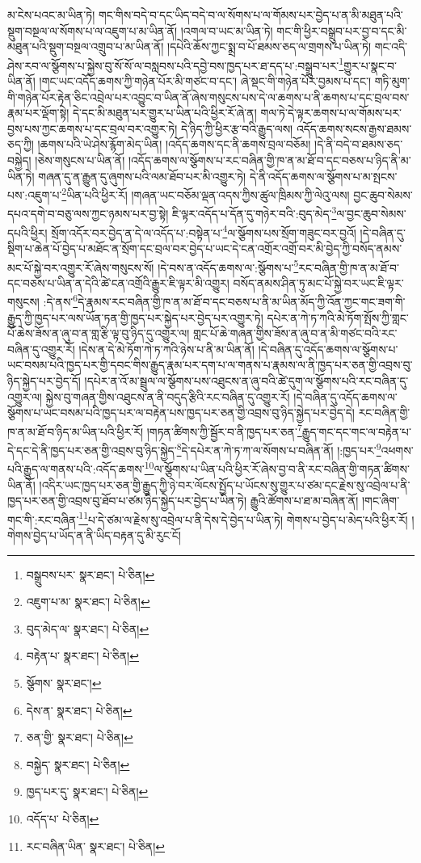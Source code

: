 མ་ངེས་པའང་མ་ཡིན་ཏེ། གང་གིས་བདེ་བ་དང་ཡིད་བདེ་བ་ལ་སོགས་པ་ལ་གོམས་པར་བྱེད་པ་ན་མི་མཐུན་པའི་སྡུག་བསྔལ་ལ་སོགས་པ་ལ་འཇུག་པ་མ་ཡིན་ནོ། །འགལ་བ་ཡང་མ་ཡིན་ཏེ། གང་གི་ཕྱིར་བསྒྲུབ་པར་བྱ་བ་དང་མི་མཐུན་པའི་སྡུག་བསྔལ་འགྲུབ་པ་མ་ཡིན་ནོ། །དཔེའི་ཆོས་ཀྱང་སྨྲ་བ་པོ་ཐམས་ཅད་ལ་གྲགས་པ་ཡིན་ཏེ། གང་འདི་ཤེས་རབ་ལ་སྩོགས་པ་སྐྱེས་བུ་སོ་སོ་ལ་བསླབས་པའི་དབྱེ་བས་ཁྱད་པར་ཐ་དད་པ་:བསྒྲུབ་པར་\footnote{བསྒྲུབས་པར་  སྣར་ཐང་།  པེ་ཅིན། }གྱུར་པ་སྣང་བ་ཡིན་ནོ། །གང་ཡང་འདོད་ཆགས་ཀྱི་གཉེན་པོར་མི་གཙང་བ་དང་། ཞེ་སྡང་གི་གཉེན་པོར་བྱམས་པ་དང་། གཏི་མུག་གི་གཉེན་པོར་རྟེན་ཅིང་འབྲེལ་པར་འབྱུང་བ་ཡིན་ནོ་ཞེས་གསུངས་པས་དེ་ལ་ཆགས་པ་ནི་ཆགས་པ་དང་བྲལ་བས་རྣམ་པར་ལྡོག་སྟེ། དེ་དང་མི་མཐུན་པར་གྱུར་པ་ཡིན་པའི་ཕྱིར་རོ་ཞེ་ན། གལ་ཏེ་དེ་ལྟར་ཆགས་པ་ལ་གོམས་པར་བྱས་པས་ཀྱང་ཆགས་པ་དང་བྲལ་བར་འགྱུར་ཏེ། དེ་ཉིད་ཀྱི་ཕྱིར་རྩ་བའི་རྒྱུད་ལས། འདོད་ཆགས་སངས་རྒྱས་ཐམས་ཅད་ཀྱི། །ཆགས་པའི་ཡེ་ཤེས་རྙོག་མེད་ཡིན། །འདོད་ཆགས་དང་ནི་ཆགས་བྲལ་བཅོམ། །དེ་ནི་བདེ་བ་ཐམས་ཅད་བསྐྱེད། །ཅེས་གསུངས་པ་ཡིན་ནོ། །འདོད་ཆགས་ལ་སྩོགས་པ་རང་བཞིན་གྱི་ཁ་ན་མ་ཐོ་བ་དང་བཅས་པ་ཉིད་ནི་མ་ཡིན་ཏེ། གཞན་དུ་ན་རྒྱུན་དུ་ཞུགས་པའི་ལམ་ཐོབ་པར་མི་འགྱུར་ཏེ། དེ་ནི་འདོད་ཆགས་ལ་སྩོགས་པ་མ་སྤངས་པས་:འཇུག་པ་\footnote{འཇུག་པ་མ་  སྣར་ཐང་།  པེ་ཅིན། }ཡིན་པའི་ཕྱིར་རོ། །གཞན་ཡང་བཅོམ་ལྡན་འདས་ཀྱིས་ཚུལ་ཁྲིམས་ཀྱི་ལེའུ་ལས། བྱང་ཆུབ་སེམས་དཔའ་དགེ་བ་བཅུ་ལས་ཀྱང་ཉམས་པར་བྱ་སྟེ། ཇི་ལྟར་འདོད་པ་དོན་དུ་གཉེར་བའི་:བུད་མེད་\footnote{བུད་མེད་ལ་  སྣར་ཐང་།  པེ་ཅིན། }ལ་བྱང་ཆུབ་སེམས་དཔའི་ཕྱིར། སྲོག་འདོར་བར་བྱེད་ན་དེ་ལ་འདོད་པ་:བསྟེན་པ་\footnote{བརྟེན་པ་  སྣར་ཐང་།  པེ་ཅིན། }ལ་སྩོགས་པས་སྲོག་གཟུང་བར་བྱའོ། །དེ་བཞིན་དུ་སྡིག་པ་ཆེན་པོ་བྱེད་པ་མཐོང་ན་སྲོག་དང་བྲལ་བར་བྱེད་པ་ཡང་དེ་ངན་འགྲོར་འགྲོ་བར་མི་བྱེད་ཀྱི་བསོད་ནམས་མང་པོ་སྐྱེ་བར་འགྱུར་རོ་ཞེས་གསུངས་སོ། །དེ་བས་ན་འདོད་ཆགས་ལ་:སྩོགས་པ་\footnote{སྩོགས་  སྣར་ཐང་། }རང་བཞིན་གྱི་ཁ་ན་མ་ཐོ་བ་དང་བཅས་པ་ཡིན་ན་དེའི་ཚེ་ངན་འགྲོའི་རྒྱུར་ཇི་ལྟར་མི་འགྱུར། བསོད་ནམས་ཤིན་ཏུ་མང་པོ་སྐྱེ་བར་ཡང་ཇི་ལྟར་གསུངས། :དེ་ནས་\footnote{དེས་ན་  སྣར་ཐང་།  པེ་ཅིན། }དེ་རྣམས་རང་བཞིན་གྱི་ཁ་ན་མ་ཐོ་བ་དང་བཅས་པ་ནི་མ་ཡིན་མོད་ཀྱི་འོན་ཀྱང་གང་ཟག་གི་རྒྱུད་ཀྱི་ཁྱད་པར་ལས་ཡོན་ཏན་གྱི་ཁྱད་པར་སྐྱེད་པར་བྱེད་པར་འགྱུར་ཏེ། དཔེར་ན་ཀེ་ཏ་ཀའི་མེ་ཏོག་སྤོས་ཀྱི་གླང་པོ་ཆེས་ཟོས་ན་ཞུ་བ་ན་གླ་རྩི་ལྟ་བུ་ཉིད་དུ་འགྱུར་ལ། གླང་པོ་ཆེ་གཞན་གྱིས་ཟོས་ན་ཞུ་བ་ན་མི་གཙང་བའི་རང་བཞིན་དུ་འགྱུར་རོ། །དེས་ན་དེ་མེ་ཏོག་ཀེ་ཏ་ཀའི་ཉེས་པ་ནི་མ་ཡིན་ནོ། །དེ་བཞིན་དུ་འདོད་ཆགས་ལ་སྩོགས་པ་ཡང་བསམ་པའི་ཁྱད་པར་གྱི་དབང་གིས་རྒྱུད་རྣམ་པར་དག་པ་ལ་གནས་པ་རྣམས་ལ་ནི་ཁྱད་པར་ཅན་གྱི་འབྲས་བུ་ཉིད་སྐྱེད་པར་བྱེད་དོ། །དཔེར་ན་འོ་མ་སྦྲུལ་ལ་སྩོགས་པས་འཐུངས་ན་ཞུ་བའི་ཚེ་དུག་ལ་སྩོགས་པའི་རང་བཞིན་དུ་འགྱུར་ལ། སྐྱེས་བུ་གཞན་གྱིས་འཐུངས་ན་ནི་བདུད་རྩིའི་རང་བཞིན་དུ་འགྱུར་རོ། །དེ་བཞིན་དུ་འདོད་ཆགས་ལ་སྩོགས་པ་ཡང་བསམ་པའི་ཁྱད་པར་ལ་བརྟེན་པས་ཁྱད་པར་ཅན་གྱི་འབྲས་བུ་ཉིད་སྐྱེད་པར་བྱེད་དེ། རང་བཞིན་གྱི་ཁ་ན་མ་ཐོ་བ་ཉིད་མ་ཡིན་པའི་ཕྱིར་རོ། །གཏན་ཚིགས་ཀྱི་སྦྱོར་བ་ནི་ཁྱད་པར་ཅན་\footnote{ཅན་གྱི་  སྣར་ཐང་།  པེ་ཅིན། }རྒྱུད་གང་དང་གང་ལ་བརྟེན་པ་དེ་དང་དེ་ནི་ཁྱད་པར་ཅན་གྱི་འབྲས་བུ་ཉིད་སྐྱེད་\footnote{བསྐྱེད་  སྣར་ཐང་།  པེ་ཅིན། }དེ་དཔེར་ན་ཀེ་ཏ་ཀ་ལ་སོགས་པ་བཞིན་ནོ། །:ཁྱད་པར་\footnote{ཁྱད་པར་དུ་  སྣར་ཐང་།  པེ་ཅིན། }འཕགས་པའི་རྒྱུད་ལ་གནས་པའི་:འདོད་ཆགས་\footnote{འདོད་པ་  པེ་ཅིན། }ལ་སྩོགས་པ་ཡིན་པའི་ཕྱིར་རོ་ཞེས་བྱ་བ་ནི་རང་བཞིན་གྱི་གཏན་ཚིགས་ཡིན་ནོ། །འདིར་ཡང་ཁྱད་པར་ཅན་གྱི་རྒྱུད་ཀྱི་ཉེ་བར་ལོངས་སྤྱོད་པ་ཡོངས་སུ་གྱུར་པ་ཙམ་དང་རྗེས་སུ་འབྲེལ་པ་ནི་ཁྱད་པར་ཅན་གྱི་འབྲས་བུ་ཐོབ་པ་ཙམ་ཉིད་སྐྱེད་པར་བྱེད་པ་ཡིན་ཏེ། རྒྱུའི་ཚོགས་པ་ཐ་མ་བཞིན་ནོ། །གང་ཞིག་གང་གི་:རང་བཞིན་\footnote{རང་བཞིན་ཡིན་  སྣར་ཐང་།  པེ་ཅིན། }པ་དེ་ཙམ་ལ་རྗེས་སུ་འབྲེལ་པ་ནི་དེས་དེ་བྱེད་པ་ཡིན་ཏེ། གེགས་པ་བྱེད་པ་མེད་པའི་ཕྱིར་རོ། །གེགས་བྱེད་པ་ཡོད་ན་ནི་ཡིད་བརྟན་དུ་མི་རུང་ངོ། 